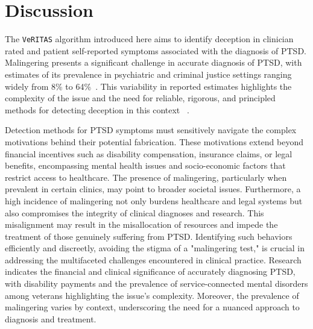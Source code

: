 \documentclass[onecolumn,10pt]{IEEEtran}
\def\vrts{\texttt{VeRITAS}\xspace}
\begin{document}
\section*{Discussion}
The  \vrts algorithm introduced here aims to identify deception in clinician rated and patient self-reported symptoms associated with the diagnosis of PTSD. Malingering presents a significant challenge in accurate diagnosis of PTSD,  with estimates of its prevalence in psychiatric and criminal justice settings ranging widely from 8\% to 64\%~\cite{mcdermott2013malingering,schmidt2020base,matto2019systematic}.  This variability in reported estimates highlights the complexity of the issue and the need for reliable, rigorous, and principled methods for detecting deception in this context ~\cite{DePaulo2003}.

Detection methods for PTSD symptoms must sensitively navigate the complex motivations behind their potential fabrication. These motivations extend beyond financial incentives such as disability compensation, insurance claims, or legal benefits, encompassing mental health issues and socio-economic factors that restrict access to healthcare. The presence of malingering, particularly when prevalent in certain clinics, may point to broader societal issues. Furthermore, a high incidence of malingering not only burdens healthcare and legal systems but also compromises the integrity of clinical diagnoses and research. This misalignment may result in the misallocation of resources and impede the treatment of those genuinely suffering from PTSD. Identifying such behaviors efficiently and discreetly, avoiding the stigma of a "malingering test," is crucial in addressing the multifaceted challenges encountered in clinical practice. Research indicates the financial and clinical significance of accurately diagnosing PTSD, with disability payments and the prevalence of service-connected mental disorders among veterans highlighting the issue's complexity. Moreover, the prevalence of malingering varies by context, underscoring the need for a nuanced approach to diagnosis and treatment.
\end{document}
